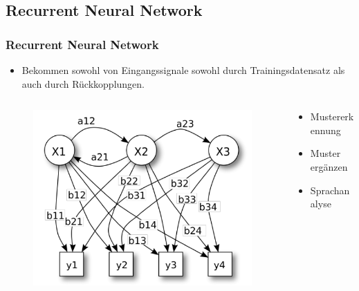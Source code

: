 \subsection{Recurrent Neural Network}

\begin{frame}
\frametitle{Recurrent Neural Network}

\begin{itemize}
\item Bekommen sowohl von Eingangssignale sowohl durch Trainingsdatensatz als auch durch Rückkopplungen. 
\end{itemize}

\begin{columns}
\hspace{10mm}

\begin{column}{.6\textwidth}

\begin{figure}
	\includegraphics[width=\linewidth]{./aktuelleEntwicklung/recurrentNN/img/rnn_aufbau_alpha}
\end{figure}

\end{column}
\begin{column}{.4\textwidth}

\vspace{-24mm}

\begin{itemize}
\item Mustererkennung
\item Muster ergänzen
\item Sprachanalyse
\end{itemize}
\end{column}

\end{columns}


\end{frame}
